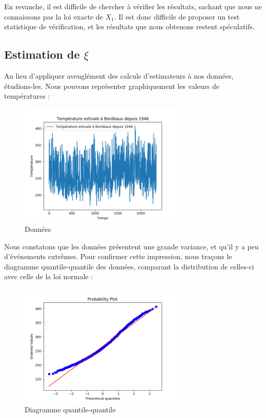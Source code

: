 \documentclass[../report.tex]{subfiles}
\begin{document}
\par En revanche, il est difficile de chercher à vérifier les résultats, sachant que nous ne connaissons pas la loi exacte de $X_1$. Il est donc difficile de proposer un test statistique de vérification, et les résultats que nous obtenons restent spéculatifs.


\subsection{Estimation de $\xi$}
\par Au lieu d'appliquer aveuglément des calculs d'estimateurs à nos données, étudions-les. Nous pouvons représenter graphiquement les valeurs de températures : 
\begin{figure}[H]
  \centering
    \includegraphics[width=0.7\textwidth]{images/part_2/temperatures.png}
  \caption{Données}
\end{figure}

\par Nous constatons que les données présentent une grande variance, et qu'il y a peu d'événements extrêmes. Pour confirmer cette impression, nous traçons le diagramme quantile-quantile des données, comparant la distribution de celles-ci avec celle de la loi normale :

\begin{figure}[H]
  \centering
    \includegraphics[width=0.7\textwidth]{images/part_2/qqplot.png}
  \caption{Diagramme quantile-quantile}
\end{figure}
\end{document}
